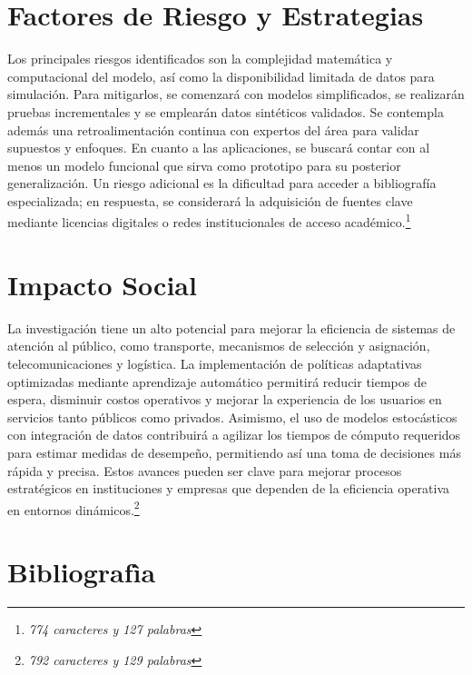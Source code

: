 \documentclass[12pt]{article}
\begin{document}
\section{Factores de Riesgo y Estrategias}
Los principales riesgos identificados son la complejidad matemática y computacional del modelo, así como la disponibilidad limitada de datos para simulación. Para mitigarlos, se comenzará con modelos simplificados, se realizarán pruebas incrementales y se emplearán datos sintéticos validados. Se contempla además una retroalimentación continua con expertos del área para validar supuestos y enfoques. En cuanto a las aplicaciones, se buscará contar con al menos un modelo funcional que sirva como prototipo para su posterior generalización. Un riesgo adicional es la dificultad para acceder a bibliografía especializada; en respuesta, se considerará la adquisición de fuentes clave mediante licencias digitales o redes institucionales de acceso académico.\footnote{\textit{774 caracteres y 127 palabras}}

\section{Impacto Social}
La investigación tiene un alto potencial para mejorar la eficiencia de sistemas de atención al público, como transporte, mecanismos de selección y asignación, telecomunicaciones y logística. La implementación de políticas adaptativas optimizadas mediante aprendizaje automático permitirá reducir tiempos de espera, disminuir costos operativos y mejorar la experiencia de los usuarios en servicios tanto públicos como privados. Asimismo, el uso de modelos estocásticos con integración de datos contribuirá a agilizar los tiempos de cómputo requeridos para estimar medidas de desempeño, permitiendo así una toma de decisiones más rápida y precisa. Estos avances pueden ser clave para mejorar procesos estratégicos en instituciones y empresas que dependen de la eficiencia operativa en entornos dinámicos.\footnote{\textit{792 caracteres y 129 palabras}}

\section{Bibliografìa}
\end{document}
